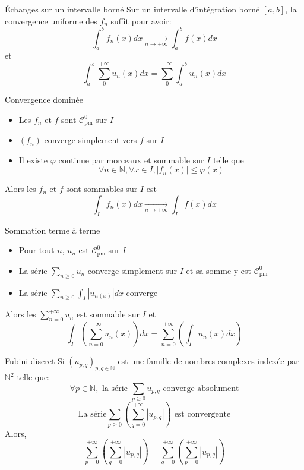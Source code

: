 \documentclass[french, a4paper, 10pt, twocolumn]{article}
\newcommand{\N}{\mathbb{N}}   %
\newcommand{\czero}{\mathcal{C}^{0}}
\newcommand{\po}{\left(}         %
\newcommand{\pf}{\right)}        %
\newcommand{\pof}[1]{\po #1 \pf} %
\renewcommand{\phi}{\varphi}
\begin{document}
\begin{theoreme}{Échanges sur un intervalle borné}
  Sur un intervalle d'intégration borné \([a,b]\), la convergence uniforme des \(f_n\) suffit pour avoir:
    \[\int_a^b f_n(x)dx \xrightarrow[n\rightarrow +\infty]{} \int_a^b f(x)dx\]
    et
    \[\int_a^b \sum_0^{+\infty} u_n(x)dx = \sum_0^{+\infty} \int_a^b u_n(x)dx\]
\end{theoreme}

\begin{theoreme}{Convergence dominée}
  \begin{itemize}[label=$\bullet$]
    \item Les \(f_n\) et \(f\) sont \(\czero_{\text{pm}}\) sur \(I\)
    \item $(f_{n})$ converge simplement vers $f$ sur \(I\)
    \item Il existe $\phi$ continue par morceaux et sommable sur \(I\) telle que
      \[\forall n \in \N, \forall x \in I, \left\lvert f_{n}(x)\right\rvert\leqslant \phi(x)\]
  \end{itemize}
  \tcblower
  Alors les $f_{n}$ et $f$ sont sommables sur $I$ est
  \[\int_{I}f_{n}(x)dx\xrightarrow[n\rightarrow +\infty]{}\int_{I}f(x)dx\]
\end{theoreme}

\begin{theoreme}{Sommation terme à terme}
  \begin{itemize}[label=$\bullet$]
    \item Pour tout $n$, $u_{n}$ est $\czero_{\text{pm}}$ sur \(I\)
    \item La série $\sum_{n \geq 0} u_{n}$ converge simplement sur \(I\) et sa somme y est \(\czero_{\text{pm}}\)
    \item La série \(\sum_{n\geqslant 0}\int_I |u_{n(x)}|dx\) converge

  \end{itemize}
  \tcblower
  Alors les $\sum\limits_{n=0}^{+\infty}u_{n}$ est sommable sur $I$ et
  \[\int_{I}\pof{\sum_{n=0}^{+\infty}u_{n}(x)}dx = \sum_{n=0}^{+\infty} \pof{\int_{I}u_{n}(x)dx}\]
\end{theoreme}

\begin{theoreme}{Fubini discret}
  Si \((u_{p,q})_{p,q \in \N}\) est une famille de nombres complexes indexée par \(\N^2\) telle que:
    \[\forall p \in \N, \text{ la série } \sum_{p\geq 0} u_{p,q} \text{ converge absolument} \]
    \[\text{La série} \sum_{p\geq 0} \left( \sum_{q=0}^{+\infty} |u_{p,q}| \right) \text{ est convergente}\]
  Alors,
    \[\sum_{p=0}^{+\infty} \left( \sum_{q=0}^{+\infty} |u_{p,q}| \right) = \sum_{q=0}^{+\infty} \left( \sum_{p=0}^{+\infty} |u_{p,q}| \right)\]
\end{theoreme}
\end{document}
